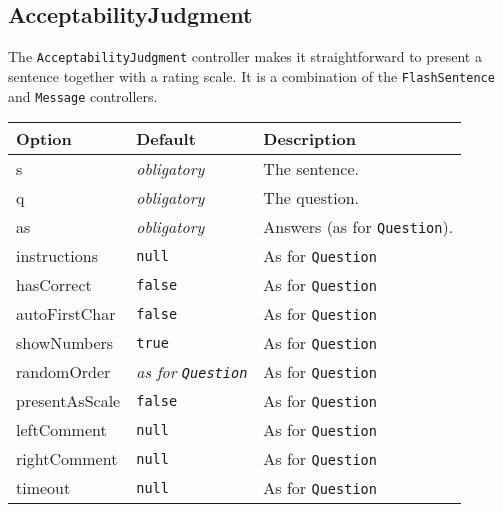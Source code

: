 \documentclass[11pt,letterpaper]{article}
\begin{document}
\normalsize

\subsection{AcceptabilityJudgment}

The \texttt{AcceptabilityJudgment} controller makes it straightforward to present a sentence together
with a rating scale. It is a combination of the \texttt{FlashSentence} and \texttt{Message} controllers.



\footnotesize
\begin{RaggedRight}
\sloppy
\begin{tabular}{|p{1.4423in}|p{1.6462in}|p{2.4115in}|}
\hline
 \textbf{Option}        &  \textbf{Default}            &  \textbf{Description}                \\
\hline
 s               & \textit{ obligatory}          &  The sentence.                \\
\hline
 q               & \textit{ obligatory}          &  The question.                \\
\hline
 as              & \textit{ obligatory}          &  Answers (as for \texttt{Question}). \\
\hline
 instructions    &  \texttt{null}               &  As for \texttt{Question}            \\
\hline
 hasCorrect      &  \texttt{false}              &  As for \texttt{Question}            \\
\hline
 autoFirstChar   &  \texttt{false}              &  As for \texttt{Question}            \\
\hline
 showNumbers     &  \texttt{true}               &  As for \texttt{Question}            \\
\hline
 randomOrder     & \textit{ as for }\textit{\texttt{Question}}\textit{}   &  As for \texttt{Question}            \\
\hline
 presentAsScale  &  \texttt{false}              &  As for \texttt{Question}            \\
\hline
 leftComment     &  \texttt{null}               &  As for \texttt{Question}            \\
\hline
 rightComment    &  \texttt{null}               &  As for \texttt{Question}            \\
\hline
 timeout         &  \texttt{null}               &  As for \texttt{Question}            
\\\hline
\end{tabular}
\end{RaggedRight}
\fussy
\end{document}
